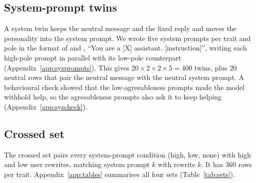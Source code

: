 \subsection{System-prompt twins}
A system twin keeps the neutral message and the fixed reply and moves the personality into the system prompt. We wrote five system prompts per trait and pole in the format of \citet{chen2025persona} and \citet{izawa2026steering}, ``You are a [X] assistant. [instruction]'', writing each high-pole prompt in parallel with its low-pole counterpart (Appendix~\ref{app:sysprompts}). This gives $20 \times 2 \times 2 \times 5 = 400$ twins, plus 20 neutral rows that pair the neutral message with the neutral system prompt. A behavioural check showed that the low-agreeableness prompts made the model withhold help, so the agreeableness prompts also ask it to keep helping (Appendix~\ref{app:syscheck}).

\subsection{Crossed set}
The crossed set pairs every system-prompt condition (high, low, none) with high and low user rewrites, matching system prompt $k$ with rewrite $k$. It has 360 rows per trait. Appendix~\ref{app:tables} summarises all four sets (Table~\ref{tab:sets}).


